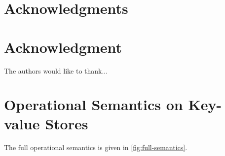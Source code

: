 \documentclass[conference,compsoc]{IEEEtran}
\newcommand{\RootPath}{.}
\begin{document}
  \section*{Acknowledgments}
\else
  \section*{Acknowledgment}
\fi
The authors would like to thank...

  


\newpage
\onecolumn
\appendices


\section{Operational Semantics on Key-value Stores}
\label{sec:full-semantics}
The full operational semantics is given in \cref{fig:full-semantics}.







\end{document}

